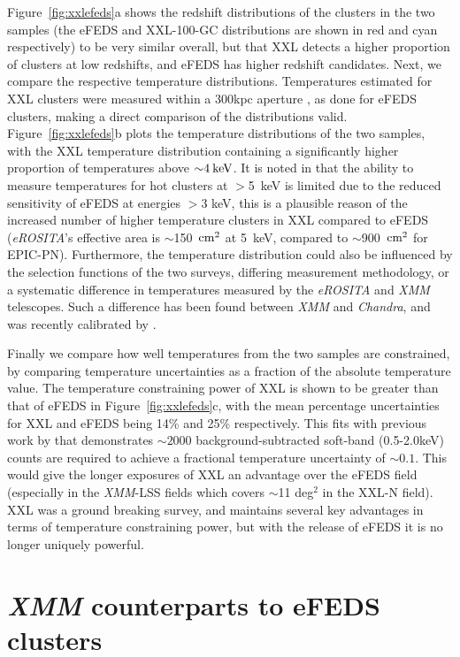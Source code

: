 \documentclass[fleqn,usenatbib]{mnras}
\begin{document}
Figure~\ref{fig:xxlefeds}a shows the redshift distributions of the clusters in the two samples (the eFEDS and XXL-100-GC distributions are shown in red and cyan respectively) to be very similar overall, but that XXL detects a higher proportion of clusters at low redshifts, and eFEDS has higher redshift candidates.  Next, we compare the respective temperature distributions.  Temperatures estimated for XXL clusters were measured within a 300kpc aperture \citep{xxllt}, as done for eFEDS clusters, making a direct comparison of the distributions valid. Figure~\ref{fig:xxlefeds}b plots the temperature distributions of the two samples, with the XXL temperature distribution containing a significantly higher proportion of temperatures above ${\sim}4\:\rm{keV}$. It is noted in \cite{efedsclustercat} that the ability to measure temperatures for hot clusters at $>$5~keV is limited due to the reduced sensitivity of eFEDS at energies $>$3 keV, this is a plausible reason of the increased number of higher temperature clusters in XXL compared to eFEDS ({\em eROSITA}'s effective area is ${\sim}$150~$\rm{cm}^2$ at 5~keV, compared to ${\sim}$900~$\rm{cm}^2$ for EPIC-PN). Furthermore, the temperature distribution could also be influenced by the selection functions of the two surveys, differing measurement methodology, or a systematic difference in temperatures measured by the {\em eROSITA} and {\em XMM} telescopes. Such a difference has been found between {\em XMM} and {\em Chandra}, and was recently calibrated by \cite{xmmchandracal}.

Finally we compare how well temperatures from the two samples are constrained, by comparing temperature uncertainties as a fraction of the absolute temperature value.  The temperature constraining power of XXL is shown to be greater than that of eFEDS in Figure~\ref{fig:xxlefeds}c, with the mean percentage uncertainties for XXL and eFEDS being 14\% and 25\% respectively. This fits with previous work by \cite{xcsmethod} that demonstrates ${\sim}2000$ background-subtracted soft-band (0.5-2.0keV) counts are required to achieve a fractional temperature uncertainty of ${\sim}0.1$. This would give the longer exposures of XXL an advantage over the eFEDS field (especially in the {\em XMM}-LSS fields which covers ${\sim}$11 deg$^{2}$ in the XXL-N field). XXL was a ground breaking survey, and maintains several key advantages in terms of temperature constraining power, but with the release of eFEDS it is no longer uniquely powerful.

\section{{\em XMM} counterparts to \lowercase{e}FEDS clusters}
\label{sec:efedsxmm}
\end{document}
